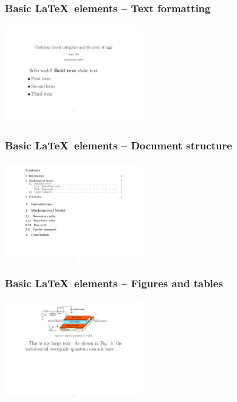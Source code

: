 \documentclass{tum-presentation}
\begin{document}
\begin{frame}
  \frametitle{Basic \LaTeX~elements -- Text formatting}

  \vspace{0.5cm}

  \begin{multicols}{2}
    

    \columnbreak

    \includegraphics[width=0.45\textwidth, frame]{figures/text}
  \end{multicols}
\end{frame}

\begin{frame}
  \frametitle{Basic \LaTeX~elements -- Document structure}

  \vspace{0.5cm}

  \begin{multicols}{2}
    

    \columnbreak

    \includegraphics[width=0.45\textwidth, frame]{figures/doc_structure}
  \end{multicols}
\end{frame}

\begin{frame}
  \frametitle{Basic \LaTeX~elements -- Figures and tables}

  \vspace{0.5cm}

  \begin{multicols}{2}
    

    \columnbreak

    \includegraphics[width=0.45\textwidth, frame]{figures/figure}
  \end{multicols}
\end{frame}
\end{document}
